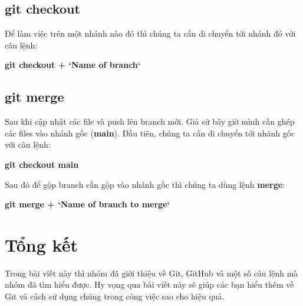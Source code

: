 \documentclass[a4paper]{report}
\begin{document}
\section{git checkout}
\textrm{Để làm việc trên một nhánh nào đó thì chúng ta cần di chuyển tới nhánh đó với câu lệnh:}
\newline
\centerline{\textbf{git checkout + `Name of branch`}}

\section{git merge}
\textrm{Sau khi cập nhật các file và push lên branch mới. Giả sử bây giờ mình cần ghép các files vào nhánh gốc (\textbf{main}).}
\newline
\textrm{Đầu tiên, chúng ta cần di chuyển tới nhánh gốc với câu lệnh:}
\newline
\centerline{\textbf{git checkout main}}
\newline
\textrm{Sau đó để gộp branch cần gộp vào nhánh gốc thì chúng ta dùng lệnh \textbf{merge}:}
\newline
\centerline{\textbf{git merge + `Name of branch to merge`}}

\chapter{Tổng kết}
\textrm{Trong bài viết này thì nhóm đã giới thiệu về Git, GitHub và một số câu lệnh mà nhóm đã tìm hiểu được. Hy vọng qua bài viết này sẽ giúp các bạn hiểu thêm về Git và cách sử dụng chúng trong công việc sao cho hiệu quả.}
\end{document}
